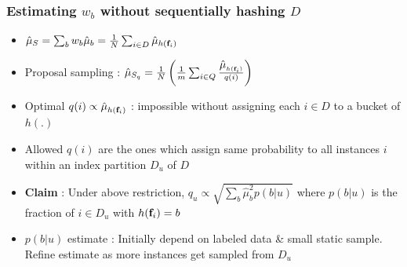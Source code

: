 \documentclass[usenames,dvipsnames, 11pt]{beamer}
\newcommand{\vek}[1]{{\bf {#1}}}
\newcommand{\vft}{{\vek{f}}}
\newcommand{\wt}{{p}}
\newcommand{\estSS}{{\mbox{$\hat{\mu}_S$}}}
\newcommand{\estSb}{{\mbox{$\hat{\mu}$}}}
\newlength{\wideitemsep}
\let\olditem\item
\renewcommand{\item}{\setlength{\itemsep}{\wideitemsep}\olditem}
\begin{document}
\begin{frame}
\frametitle{Estimating $w_b$ without sequentially hashing $D$}
\begin{itemize}
\pause
\item $\estSS=\sum_b{w_b\hat{\mu}_b}=\frac{1}{N}\sum_{i \in D}\hat{\mu}_{h(\vft_i)}$
\pause
\item Proposal sampling : $\hat{\mu}_{S_q} = \frac{1}{N}\left(\frac{1}{m}\sum_{i\in Q} \frac{\estSb_{h(\vft_i)}}{q(i)}\right)$
\pause
\item Optimal $q(i) \propto \estSb_{h(\vft_i)}$ : impossible without assigning each $i \in D$ to a bucket of $h(.)$
\pause
\item Allowed $q(i)$ are the ones which assign same probability to all instances $i$ within an index partition $D_u$ of $D$
\pause
\item \textbf{Claim} : Under above restriction, $q_u \propto \sqrt{\sum_{b}\estSb^2_b\wt(b|u)}$ where $\wt(b|u)$ is the fraction of  $i\in D_u$ with $h(\vft_i)=b$
\pause
\item $\wt(b|u)$ estimate : Initially depend on labeled data \& small static sample. Refine estimate as more instances get sampled from $D_u$
\pause
\end{itemize}
\end{frame}

\end{document}
